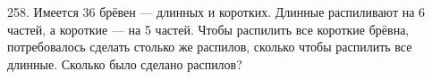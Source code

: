 258. Имеется 36 брёвен --- длинных и коротких. Длинные распиливают на 6 частей, а короткие --- на 5 частей. Чтобы распилить все короткие брёвна, потребовалось сделать столько же распилов, сколько чтобы распилить все длинные. Сколько было сделано распилов?\\
